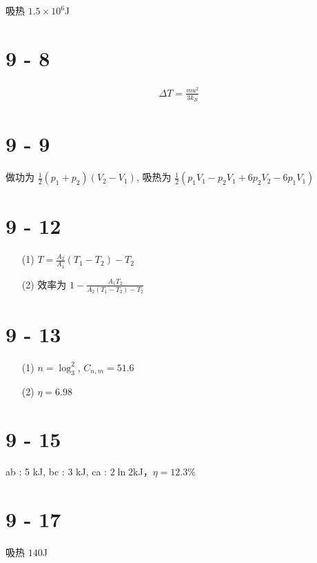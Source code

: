 \documentclass{article}
\begin{document}
吸热 $1.5 \times 10^6$J

\section*{9 - 8}

\begin{align*}
    \Delta T = \frac{mu^2}{3k_B}
\end{align*}

\section*{9 - 9}

做功为 $\frac{1}{2}(p_1 + p_2)(V_2 - V_1)$, 吸热为 $\frac{1}{2}(p_1V_1 - p_2V_1 + 6p_2V_2 - 6p_1V_1)$

\section*{9 - 12}

\begin{itemize}
    \item [(1)] $T = \frac{A_2}{A_1}(T_1 - T_2) - T_2$
    \item [(2)] 效率为 $1 - \frac{A_1T_2}{A_2(T_1 - T_2) - T_2}$
\end{itemize}

\section*{9 - 13}

\begin{itemize}
    \item [(1)] $n = \log_3^2$, $C_{n, m} = 51.6$
    \item [(2)] $\eta = 6.98$
\end{itemize}

\section*{9 - 15}

ab : 5 kJ, bc : 3 kJ, ca : $2 \ln 2$kJ，$\eta = 12.3\%$

\section*{9 - 17}

吸热 $140$J
\end{document}
